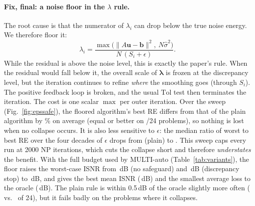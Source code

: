 \paragraph{Fix, final: a noise floor in the $\lambda$ rule.} The root cause is that
the numerator of $\lambda_i$ can drop below the true noise energy. We therefore floor it:
\begin{equation}
\lambda_i=\frac{\max\big(\|A\mathbf u-\mathbf b\|^2,\ N\hat\sigma^2\big)}{N\,(S_i+\epsilon)} .
\label{eq:floor}
\end{equation}
While the residual is above the noise level, this is exactly the paper's rule. When the
residual would fall below it, the overall scale of $\boldsymbol\lambda$ is frozen at the
discrepancy level, but the iteration continues to refine \emph{where} the smoothing goes
(through $S_i$). The positive feedback loop is broken, and the usual $\mathrm{Tol}$ test
then terminates the iteration. The cost is one scalar $\max$ per outer iteration.
Over the sweep (Fig.~\ref{fig:epssafe}), the floored algorithm's best RE differs from that of
the plain algorithm by \nFloorMinLoss\% on average (equal or better on \nFloorBetter/24
problems), so nothing is lost when no collapse occurs. It is also less sensitive to
$\epsilon$: the median ratio of worst to best RE over the four decades of $\epsilon$ drops
from \nWorstPlain{} (plain) to \nWorstFloor{}. This sweep caps every run at 2000 NP
iterations, which cuts the collapse short and therefore \emph{understates} the benefit.
With the full budget used by MULTI-auto (Table~\ref{tab:variants}), the floor raises the
worst-case ISNR from \nVarNoneWorst\,dB (no safeguard) and \nVarStopWorst\,dB (discrepancy
stop) to \nVarFloorWorst\,dB, and gives the best mean ISNR (\nVarFloorMean\,dB) and the
smallest average loss to the oracle (\nVarFloorLoss\,dB). The plain rule is within
0.5\,dB of the oracle slightly more often (\nVarNoneWithin{} vs.\ \nVarFloorWithin{} of 24),
but it fails badly on the problems where it collapses.

\begin{table}[t]
\centering\small
{}
\caption{MULTI-auto on the 24 main problems with each $\lambda$-collapse safeguard
($\kappa$ re-calibrated for each variant on its own $\epsilon$-sweep, except ``none'', which
uses our initial calibration). ISNR and MSSIM are means; ``worst'' is the worst single
problem; ``loss'' is the mean ISNR gap to oracle-tuned MULTI, and the last column counts the
problems within 0.5\,dB of it. The last row is MULTI-autoS (Sec.~\ref{sec:auto}).}
\label{tab:variants}
\end{table}


